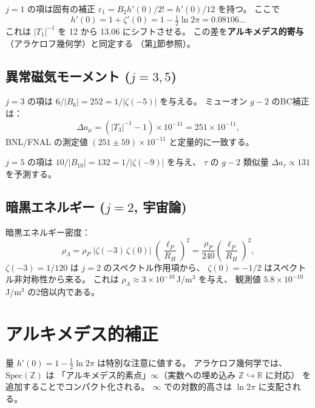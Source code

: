 \documentclass[11pt,a4paper]{article}
\newcommand{\Spec}{\mathrm{Spec}}
\begin{document}
$j=1$ の項は固有の補正
$\varepsilon_1=B_2 h'(0)/2!=h'(0)/12$ を持つ。
ここで
\begin{equation}\label{eq:hprime}
  h'(0)=1+\zeta'(0)=1-\tfrac{1}{2}\ln 2\pi=0.08106\ldots
\end{equation}
これは $|T_1|^{-1}$ を 12 から 13.06 にシフトさせる。
この差を\textbf{アルキメデス的寄与}（アラケロフ幾何学）と同定する
（第\ref{sec:arch}節参照）。

\subsection{異常磁気モーメント ($j=3,5$)}

$j=3$ の項は $6/|B_6|=252=1/|\zeta(-5)|$ を与える。
ミューオン $g-2$ のBC補正は：
\begin{equation}
  \Delta a_\mu = (|T_3|^{-1}-1)\times 10^{-11}=251\times 10^{-11},
\end{equation}
BNL/FNAL の測定値 $(251\pm 59)\times 10^{-11}$ と定量的に一致する。

$j=5$ の項は $10/|B_{10}|=132=1/|\zeta(-9)|$ を与え、
$\tau$ の $g-2$ 類似量 $\Delta a_\tau\propto 131$ を予測する。

\subsection{暗黒エネルギー ($j=2$, 宇宙論)}

暗黒エネルギー密度：
\begin{equation}\label{eq:dark}
  \rho_\Lambda = \rho_P\;|\zeta(-3)\,\zeta(0)|\;\left(\frac{\ell_P}{R_H}\right)^2
  = \frac{\rho_P}{240}\left(\frac{\ell_P}{R_H}\right)^2,
\end{equation}
$\zeta(-3)=1/120$ は $j=2$ のスペクトル作用項から、
$\zeta(0)=-1/2$ はスペクトル非対称性から来る。
これは $\rho_\Lambda\approx 3\times 10^{-10}$\,J/m$^3$ を与え、
観測値 $5.8\times 10^{-10}$\,J/m$^3$ の2倍以内である。

\section{アルキメデス的補正}\label{sec:arch}

量 $h'(0)=1-\frac{1}{2}\ln 2\pi$ は特別な注意に値する。
アラケロフ幾何学では、$\Spec(\mathbb{Z})$ は
「アルキメデス的素点」$\infty$（実数への埋め込み
$\mathbb{Z}\hookrightarrow\mathbb{R}$ に対応）
を追加することでコンパクト化される。
$\infty$ での対数的高さは $\ln 2\pi$ に支配される。
\end{document}
